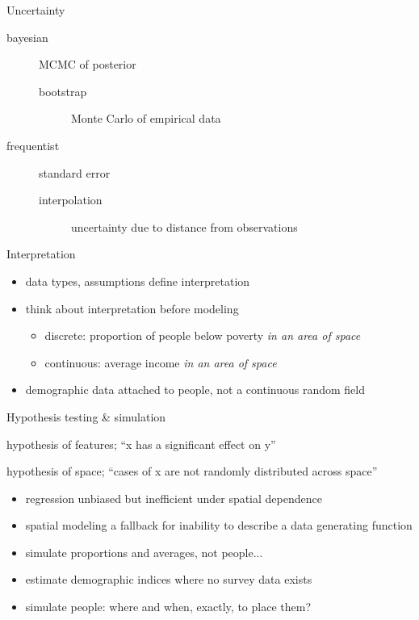 \documentclass{beamer}
\begin{document}
\begin{frame}{Uncertainty}
  \begin{description}
  \item [bayesian] MCMC of posterior
    \begin{description}
    \item [bootstrap] Monte Carlo of empirical data
    \end{description}
  \item [frequentist] standard error
    \begin{description}
    \item [interpolation] uncertainty due to distance from observations
    \end{description}
  \end{description}
\end{frame}


\begin{frame}{Interpretation}
  \begin{itemize}
  \item data types, assumptions define interpretation
  \item think about interpretation before modeling
    \begin{itemize}
    \item discrete: proportion of people below poverty {\em in an area of space}
    \item continuous: average income {\em in an area of space}
    \end{itemize}
  \item demographic data attached to people, not a continuous random field
  \end{itemize}
\end{frame}


\begin{frame}{Hypothesis testing \& simulation}
  
  \item hypothesis of features; ``x has a significant effect on y''
  \item hypothesis of space; ``cases of x are not randomly distributed across space''
  \begin{itemize}
  \item regression unbiased but inefficient under spatial dependence
  \item spatial modeling a fallback for inability to describe a data generating function
  \item simulate proportions and averages, not people...
  \item estimate demographic indices where no survey data exists
  \item simulate people: where and when, exactly, to place them?
  \end{itemize}
\end{frame}
\end{document}
